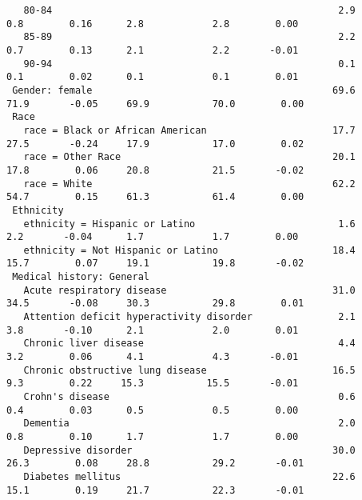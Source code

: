 \documentclass[]{article}
\begin{document}
\begin{verbatim}
   80-84                                                  2.9             0.8        0.16      2.8            2.8        0.00    
   85-89                                                  2.2             0.7        0.13      2.1            2.2       -0.01    
   90-94                                                  0.1             0.1        0.02      0.1            0.1        0.01    
 Gender: female                                          69.6            71.9       -0.05     69.9           70.0        0.00    
 Race                                                                                                                            
   race = Black or African American                      17.7            27.5       -0.24     17.9           17.0        0.02    
   race = Other Race                                     20.1            17.8        0.06     20.8           21.5       -0.02    
   race = White                                          62.2            54.7        0.15     61.3           61.4        0.00    
 Ethnicity                                                                                                                       
   ethnicity = Hispanic or Latino                         1.6             2.2       -0.04      1.7            1.7        0.00    
   ethnicity = Not Hispanic or Latino                    18.4            15.7        0.07     19.1           19.8       -0.02    
 Medical history: General                                                                                                        
   Acute respiratory disease                             31.0            34.5       -0.08     30.3           29.8        0.01    
   Attention deficit hyperactivity disorder               2.1             3.8       -0.10      2.1            2.0        0.01    
   Chronic liver disease                                  4.4             3.2        0.06      4.1            4.3       -0.01    
   Chronic obstructive lung disease                      16.5             9.3        0.22     15.3           15.5       -0.01    
   Crohn's disease                                        0.6             0.4        0.03      0.5            0.5        0.00    
   Dementia                                               2.0             0.8        0.10      1.7            1.7        0.00    
   Depressive disorder                                   30.0            26.3        0.08     28.8           29.2       -0.01    
   Diabetes mellitus                                     22.6            15.1        0.19     21.7           22.3       -0.01    

\end{verbatim}
\end{document}
